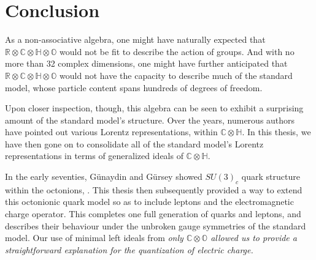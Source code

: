 \documentclass[letterpaper,12pt,titlepage,oneside,final]{book}
\newcommand{\CH}{\mathbb{C}\otimes\mathbb{H}}
\newcommand{\CO}{\mathbb{C}\otimes\mathbb{O}}
\newcommand{\RCHO}{\mathbb{R}\otimes\mathbb{C}\otimes\mathbb{H}\otimes\mathbb{O}}
\begin{document}
















\chapter{Conclusion}

As a non-associative algebra, one might have naturally expected that $\RCHO$ would not be fit to describe the action of groups.  And with no more than 32 complex dimensions, one might have further anticipated that $\RCHO$ would not have the capacity to describe much of the standard model, whose particle content spans hundreds of degrees of freedom.  

Upon closer inspection, though, this algebra can be seen to exhibit a surprising amount of the standard model's structure.  Over the years, numerous authors have pointed out various Lorentz representations, within $\CH$.  In this thesis, we have then gone on to consolidate all of the standard model's Lorentz representations in terms of generalized ideals of $\CH$.  

In the early seventies, G\"{u}naydin and G\"{u}rsey  showed  $SU(3)_c$ quark structure within the octonions, \cite{GGquarks}.  
This thesis then subsequently provided a way to extend this octonionic quark model so as to include leptons and the electromagnetic charge operator.  This completes one full generation of quarks and leptons, and describes their behaviour under the unbroken gauge symmetries of the standard model.  Our use of minimal left ideals from \it only \rm $\CO$ allowed us to provide a straightforward explanation for the quantization of electric charge.
\end{document}
